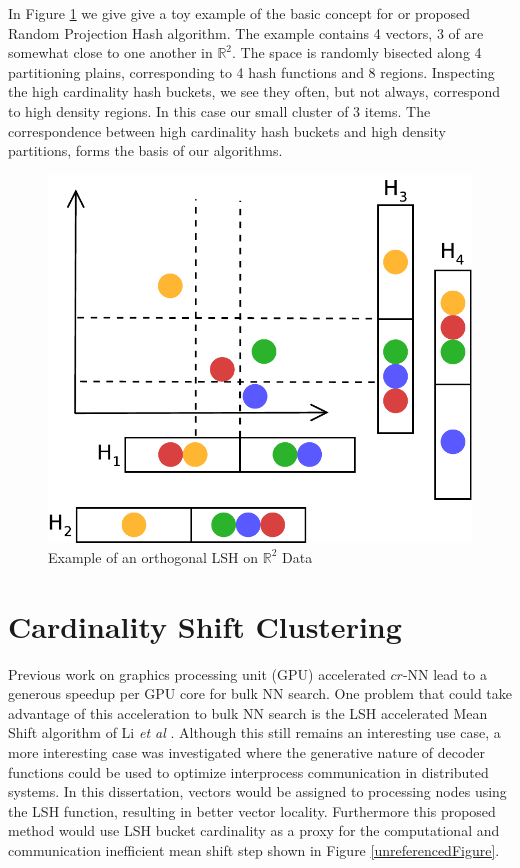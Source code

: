 In Figure \ref{lshclust} we give give a toy example of the basic concept for or proposed Random Projection Hash algorithm.
The example contains 4 vectors, 3 of are somewhat close to one another in $\mathbb{R}^2$.  The space is randomly bisected along
4 partitioning plains, corresponding to 4 hash functions and 8 regions.  Inspecting the high cardinality hash buckets, we see
they often, but not always, correspond to high density regions.  In this case our small cluster of 3 items. The
correspondence between high cardinality hash buckets and high density partitions, forms the basis of our algorithms.
\begin{figure}
    \centerline{\includegraphics[width=.6\textwidth]{figs/multiLSHClustering}}
    \caption{Example of an orthogonal LSH on $\mathbb{R}^2$ Data}\label{lshclust}
\end{figure}

\section{Cardinality Shift Clustering}
Previous work on graphics processing unit (GPU) accelerated $cr$-NN \cite{carraher} lead to a generous speedup per GPU core for bulk NN search.
One problem that could take advantage of this acceleration to bulk NN search is the LSH accelerated Mean Shift algorithm
of Li \emph{et al} \cite{Li09}.  Although this still remains an interesting use case, a more interesting case was
investigated where the generative nature of decoder functions could be used to optimize interprocess communication in
distributed systems.  In this dissertation, vectors would be assigned to processing nodes using the LSH function, resulting
in better vector locality.  Furthermore this proposed method would use LSH bucket cardinality as a proxy for the
computational and communication inefficient mean shift step shown in Figure \ref{unreferencedFigure}.

